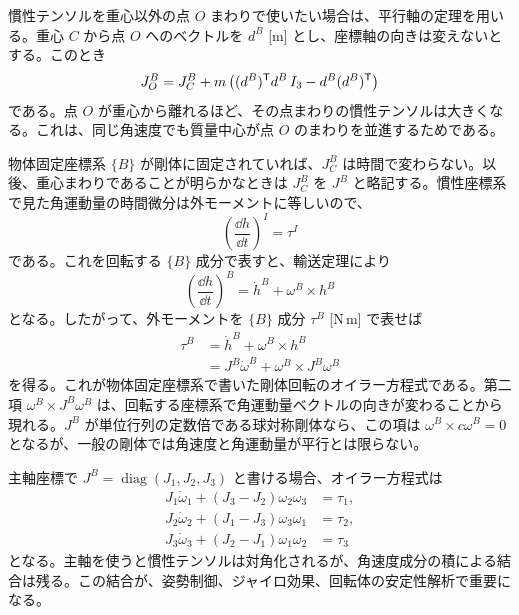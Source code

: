 慣性テンソルを重心以外の点 $O$ まわりで使いたい場合は、平行軸の定理を用いる。重心 $C$ から点 $O$ へのベクトルを $d^B$ [m] とし、座標軸の向きは変えないとする。このとき
\begin{equation}
  J_O^B
  =
  J_C^B
  +
  m\left((d^B)^{\mathsf{T}} d^B\,I_3-d^B(d^B)^{\mathsf{T}}\right)
\end{equation}
である。点 $O$ が重心から離れるほど、その点まわりの慣性テンソルは大きくなる。これは、同じ角速度でも質量中心が点 $O$ のまわりを並進するためである。

物体固定座標系 $\{B\}$ が剛体に固定されていれば、$J_C^B$ は時間で変わらない。以後、重心まわりであることが明らかなときは $J_C^B$ を $J^B$ と略記する。慣性座標系で見た角運動量の時間微分は外モーメントに等しいので、
\begin{equation}
  \left(\frac{\dd h}{\dd t}\right)^I=\tau^I
\end{equation}
である。これを回転する $\{B\}$ 成分で表すと、輸送定理により
\begin{equation}
  \left(\frac{\dd h}{\dd t}\right)^B
  =\dot{h}^B+\omega^B\times h^B
\end{equation}
となる。したがって、外モーメントを $\{B\}$ 成分 $\tau^B$ [N\,m] で表せば
\begin{align}
  \tau^B
  &=\dot{h}^B+\omega^B\times h^B\\
  &=J^B\dot{\omega}^B+\omega^B\times J^B\omega^B
\end{align}
を得る。これが物体固定座標系で書いた剛体回転のオイラー方程式である。第二項 $\omega^B\times J^B\omega^B$ は、回転する座標系で角運動量ベクトルの向きが変わることから現れる。$J^B$ が単位行列の定数倍である球対称剛体なら、この項は $\omega^B\times c\omega^B=0$ となるが、一般の剛体では角速度と角運動量が平行とは限らない。

主軸座標で $J^B=\operatorname{diag}(J_1,J_2,J_3)$ と書ける場合、オイラー方程式は
\begin{align}
  J_1\dot{\omega}_1+(J_3-J_2)\omega_2\omega_3&=\tau_1,\\
  J_2\dot{\omega}_2+(J_1-J_3)\omega_3\omega_1&=\tau_2,\\
  J_3\dot{\omega}_3+(J_2-J_1)\omega_1\omega_2&=\tau_3
\end{align}
となる。主軸を使うと慣性テンソルは対角化されるが、角速度成分の積による結合は残る。この結合が、姿勢制御、ジャイロ効果、回転体の安定性解析で重要になる。

